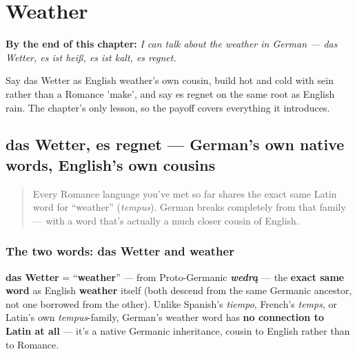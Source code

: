 
\chapter{Weather}
\label{ch:ge-weather}

\begin{chapteropening}
\textbf{By the end of this chapter:} \emph{I can talk about the weather in German — das Wetter, es ist heiß, es ist kalt, es regnet.}

Say das Wetter as English weather's own cousin, build hot and cold with sein rather than a Romance 'make', and say es regnet on the same root as English rain. The chapter's only lesson, so the payoff covers everything it introduces.
\end{chapteropening}

\section[das Wetter, es regnet]{das Wetter, es regnet — German's own native words, English's own cousins}

\label{lesson:GE-C21-das-wetter}



\begin{quote}
Every Romance language you've met so far shares the exact same Latin word for \textquotedblleft{}weather\textquotedblright{} (\emph{tempus}). German breaks completely from that family — with a word that's actually a much closer cousin of English.
\end{quote}

\subsection*{The two words: das Wetter and weather}
\textbf{das Wetter} = \textquotedblleft{}\textbf{weather}\textquotedblright{} — from Proto-Germanic \emph{\textbf{wedrą}} — the \textbf{exact same word} as English \textbf{weather} itself (both descend from the same Germanic ancestor, not one borrowed from the other). Unlike Spanish's \emph{tiempo}, French's \emph{temps}, or Latin's own \emph{tempus}-family, German's weather word has \textbf{no connection to Latin at all} — it's a native Germanic inheritance, cousin to English rather than to Romance.

